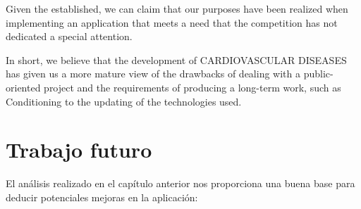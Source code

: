 \documentclass[11pt,spanish,
		listoftables,listoffigures]
		{tfgplantilla}
\begin{document}
Given the established, we can claim that our purposes have been realized when implementing an application that meets a need that the competition has not dedicated a special attention.

In short, we believe that the development of \MakeUppercase {Cardiovascular Diseases} has given us a more mature view of the drawbacks of dealing with a public-oriented project and the requirements of producing a long-term work, such as Conditioning to the updating of the technologies used.


\chapter{Trabajo futuro}
El análisis realizado en el capítulo anterior nos proporciona una buena base para deducir potenciales mejoras en la aplicación:
\end{document}
